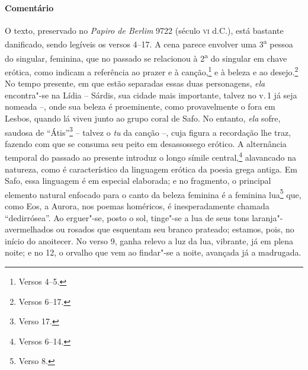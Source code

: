 {\paragraph{Comentário} O texto, preservado no \textit{Papiro de Berlim} 9722 (século \textsc{vi}
d.C.), está bastante danificado, sendo legíveis os versos 4--17.
A cena parece envolver uma 3\textsuperscript{a} pessoa do
singular, feminina, que no passado se relacionou à 2\textsuperscript{a} do
singular em chave erótica, como indicam a referência ao prazer e à canção,\footnote{Versos 4--5.} e à beleza e ao desejo.\footnote{Versos 6--17.} No tempo presente, 
em que estão separadas essas duas personagens, \textit{ela} encontra"-se na Lídia -- Sárdis, sua cidade mais importante, talvez no v.\,1 já seja nomeada --, onde sua beleza é proeminente, como provavelmente o fora em Lesbos, quando lá viveu junto ao grupo coral de Safo. No entanto, \textit{ela} sofre, saudosa de ``Átis''\footnote{Verso 17.} -- talvez o \textit{tu} da canção --, cuja figura a recordação lhe traz, fazendo
com que se consuma seu peito em desassossego erótico. A alternância temporal do
passado ao presente introduz o longo símile central,\footnote{Versos 6--14.} alavancado
na natureza, como é característico da linguagem erótica da poesia grega antiga.
Em Safo, essa linguagem é em especial elaborada; e no fragmento, o principal
elemento natural enfocado para o canto da beleza feminina é a feminina lua\footnote{Verso 8.} que, como Eos, a Aurora, nos poemas homéricos, é inesperadamente
chamada ``dedirrósea''. Ao erguer"-se, posto o sol, tinge"-se a lua
de seus tons laranja"-avermelhados ou rosados que esquentam seu branco prateado;
estamos, pois, no início do anoitecer. No verso 9, ganha relevo a luz da lua,
vibrante, já em plena noite; e no 12, o orvalho que vem ao findar"-se a noite,
avançada já a madrugada.

}
